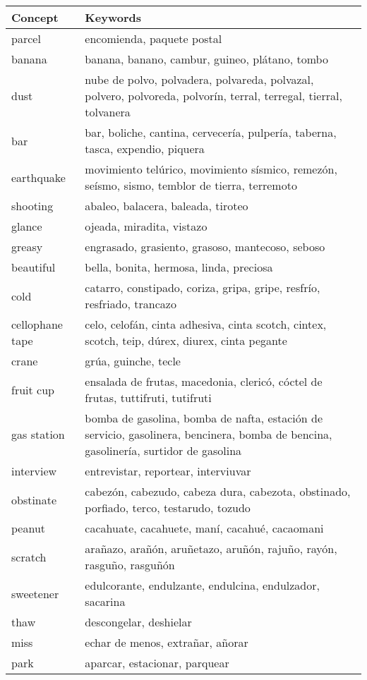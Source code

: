 \documentclass[11pt]{article}
\begin{document}
\begin{table}[t]
\begin{tabularx}{\linewidth}{l X}
\hline \bf Concept & \bf Keywords \\ \hline
parcel & encomienda, paquete postal \\
banana & banana, banano, cambur, guineo, plátano, tombo \\
dust & nube de polvo, polvadera, polvareda, polvazal, polvero, polvoreda, polvorín, terral, terregal, tierral, tolvanera \\
bar & bar, boliche, cantina, cervecería, pulpería, taberna, tasca, expendio, piquera \\
earthquake & movimiento telúrico, movimiento sísmico, remezón, seísmo, sismo, temblor de tierra, terremoto \\
shooting & abaleo, balacera, baleada, tiroteo \\
glance & ojeada, miradita, vistazo \\greasy & engrasado, grasiento, grasoso, mantecoso, seboso \\
beautiful & bella, bonita, hermosa, linda, preciosa \\
cold & catarro, constipado, coriza, gripa, gripe, resfrío, resfriado, trancazo \\
cellophane tape & celo, celofán, cinta adhesiva, cinta scotch, cintex, scotch, teip, dúrex, diurex, cinta pegante \\
crane & grúa, guinche, tecle \\
fruit cup & ensalada de frutas, macedonia, clericó, cóctel de frutas, tuttifruti, tutifruti \\
gas station & bomba de gasolina, bomba de nafta, estación de servicio, gasolinera, bencinera, bomba de bencina, gasolinería, surtidor de gasolina \\
interview & entrevistar, reportear, interviuvar \\
obstinate & cabezón, cabezudo, cabeza dura, cabezota, obstinado, porfiado, terco, testarudo, tozudo \\
peanut & cacahuate, cacahuete, maní, cacahué, cacaomani \\
scratch & arañazo, arañón, aruñetazo, aruñón, rajuño, rayón, rasguño, rasguñón \\
sweetener & edulcorante, endulzante, endulcina, endulzador, sacarina \\
thaw & descongelar, deshielar \\
miss & echar de menos, extrañar, añorar \\
park & aparcar, estacionar, parquear \\
\hline
\end{tabularx}
\end{table}
\end{document}
